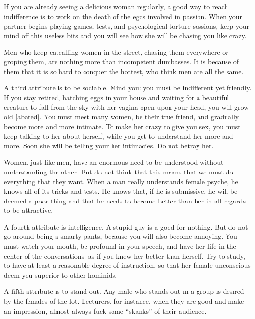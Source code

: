 \par If you are already seeing a delicious woman regularly, a good way to reach indifference is to work on the death of the egos involved in passion. When your partner begins playing games, tests, and psychological torture sessions, keep your mind off this useless bits and you will see how she will be chasing you like crazy.

\par Men who keep catcalling women in the street, chasing them everywhere or groping them, are nothing more than incompetent dumbasses. It is because of them that it is so hard to conquer the hottest, who think men are all the same.

\par A third attribute is to be sociable. Mind you: you must be indifferent yet friendly. If you stay retired, hatching eggs in your house and waiting for a beautiful creature to fall from the sky with her vagina open upon your head, you will grow old [abated]. You must meet many women, be their true friend, and gradually become more and more intimate. To make her crazy to give you sex, you must keep talking to her about herself, while you get to understand her more and more. Soon she will be telling your her intimacies. Do not betray her.

\par Women, just like men, have an enormous need to be understood without understanding the other. But do not think that this means that we must do everything that they want. When a man really understands female psyche, he knows all of its tricks and tests. He knows that, if he is submissive, he will be deemed a poor thing and that he needs to become better than her in all regards to be attractive.

\par A fourth attribute is intelligence. A stupid guy is a good-for-nothing. But do not go around being a smarty pants, because you will also become annoying. You must watch your mouth, be profound in your speech, and have her life in the center of the conversations, as if you knew her better than herself. Try to study, to have at least a reasonable degree of instruction, so that her female unconscious deem you superior to other hominids.

\par A fifth attribute is to stand out. Any male who stands out in a group is desired by the females of the lot. Lecturers, for instance, when they are good and make an impression, almost always fuck some \enquote{skanks} of their audience.